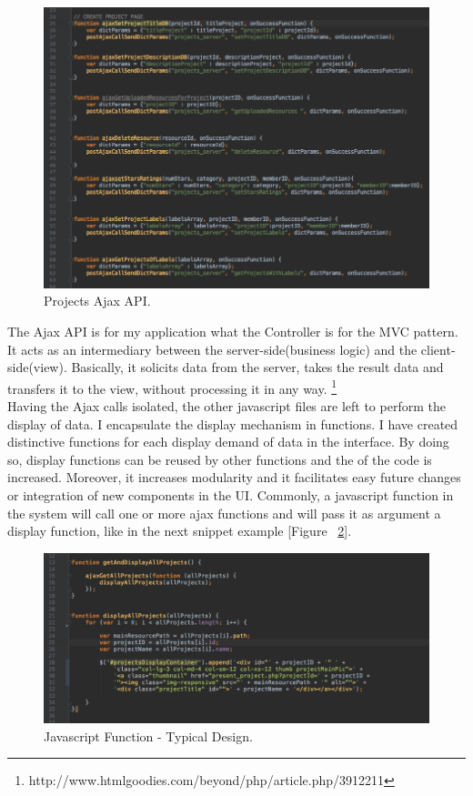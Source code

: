 \begin{figure}
\includegraphics[width=1\linewidth]{images/AjaxProjectsAPI.png}
\caption{Projects Ajax API.}
\label{fig:ajax_projects_API}
\end{figure}


The Ajax API is for my application what the Controller is for the MVC pattern. It acts as an intermediary between the server-side(business logic) and the client-side(view). Basically, it solicits data from the server, takes the result data and transfers it to the view, without processing it in any way. \footnote{http://www.htmlgoodies.com/beyond/php/article.php/3912211}	\\  

Having the Ajax calls isolated, the other javascript files are left to perform the display of data. I encapsulate the display mechanism in functions. 
I have created distinctive functions for each display demand of data in the interface. By doing so, display functions can be reused by other functions and the  of the code is increased. Moreover, it increases modularity and it facilitates easy future changes or integration of new components in the UI.
Commonly, a javascript function in the system will call one or more ajax functions and will pass it as argument a display function, like in the next snippet example [Figure ~\ref{fig:javascript_function}].\\ 

\begin{figure}
\includegraphics[width=1\linewidth]{images/JavascriptFunction.png}
\caption{Javascript Function - Typical Design.}
\label{fig:javascript_function}
\end{figure}


